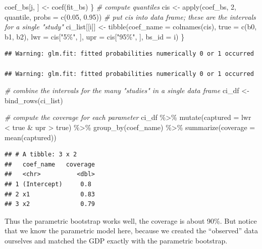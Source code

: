 \documentclass[
]{book}
\newenvironment{Shaded}{\begin{snugshade}}{\end{snugshade}}
\newcommand{\AttributeTok}[1]{\textcolor[rgb]{0.77,0.63,0.00}{#1}}
\newcommand{\CommentTok}[1]{\textcolor[rgb]{0.56,0.35,0.01}{\textit{#1}}}
\newcommand{\DecValTok}[1]{\textcolor[rgb]{0.00,0.00,0.81}{#1}}
\newcommand{\FloatTok}[1]{\textcolor[rgb]{0.00,0.00,0.81}{#1}}
\newcommand{\FunctionTok}[1]{\textcolor[rgb]{0.00,0.00,0.00}{#1}}
\newcommand{\NormalTok}[1]{#1}
\newcommand{\OtherTok}[1]{\textcolor[rgb]{0.56,0.35,0.01}{#1}}
\newcommand{\SpecialCharTok}[1]{\textcolor[rgb]{0.00,0.00,0.00}{#1}}
\newcommand{\StringTok}[1]{\textcolor[rgb]{0.31,0.60,0.02}{#1}}
\begin{document}
\begin{Shaded}
\begin{Highlighting}[]
\NormalTok{    coef\_bs[j, ] }\OtherTok{\textless{}{-}} \FunctionTok{coef}\NormalTok{(fit\_bs)}
\NormalTok{  \}}
  \CommentTok{\# compute quantiles}
\NormalTok{  cis }\OtherTok{\textless{}{-}} \FunctionTok{apply}\NormalTok{(coef\_bs, }\DecValTok{2}\NormalTok{, quantile, }\AttributeTok{probs =} \FunctionTok{c}\NormalTok{(}\FloatTok{0.05}\NormalTok{, }\FloatTok{0.95}\NormalTok{))}
  \CommentTok{\# put cis into data frame; these are the intervals for a single "study"}
\NormalTok{  ci\_list[[i]] }\OtherTok{\textless{}{-}} \FunctionTok{tibble}\NormalTok{(}\AttributeTok{coef\_name =} \FunctionTok{colnames}\NormalTok{(cis),}
                         \AttributeTok{true =} \FunctionTok{c}\NormalTok{(b0, b1, b2),}
                  \AttributeTok{lwr =}\NormalTok{ cis[}\StringTok{"5\%"}\NormalTok{, ],}
                  \AttributeTok{upr =}\NormalTok{ cis[}\StringTok{"95\%"}\NormalTok{, ], }
                  \AttributeTok{bs\_id =}\NormalTok{ i)}
\NormalTok{\}}
\end{Highlighting}
\end{Shaded}

\begin{verbatim}
## Warning: glm.fit: fitted probabilities numerically 0 or 1 occurred

## Warning: glm.fit: fitted probabilities numerically 0 or 1 occurred
\end{verbatim}

\begin{Shaded}
\begin{Highlighting}[]
\CommentTok{\# combine the intervals for the many "studies" in a single data frame}
\NormalTok{ci\_df }\OtherTok{\textless{}{-}} \FunctionTok{bind\_rows}\NormalTok{(ci\_list)}

\CommentTok{\# compute the coverage for each parameter}
\NormalTok{ci\_df }\SpecialCharTok{\%\textgreater{}\%}
  \FunctionTok{mutate}\NormalTok{(}\AttributeTok{captured =}\NormalTok{ lwr }\SpecialCharTok{\textless{}}\NormalTok{ true }\SpecialCharTok{\&}\NormalTok{ upr }\SpecialCharTok{\textgreater{}}\NormalTok{ true) }\SpecialCharTok{\%\textgreater{}\%}
  \FunctionTok{group\_by}\NormalTok{(coef\_name) }\SpecialCharTok{\%\textgreater{}\%}
  \FunctionTok{summarize}\NormalTok{(}\AttributeTok{coverage =} \FunctionTok{mean}\NormalTok{(captured))}
\end{Highlighting}
\end{Shaded}

\begin{verbatim}
## # A tibble: 3 x 2
##   coef_name   coverage
##   <chr>          <dbl>
## 1 (Intercept)     0.8 
## 2 x1              0.83
## 3 x2              0.79
\end{verbatim}

Thus the parametric bootstrap works well, the coverage is about 90\%.
But notice that we know the parametric model here, because we created
the ``observed'' data ourselves and matched the GDP exactly with the
parametric bootstrap.

\backmatter
\end{document}
